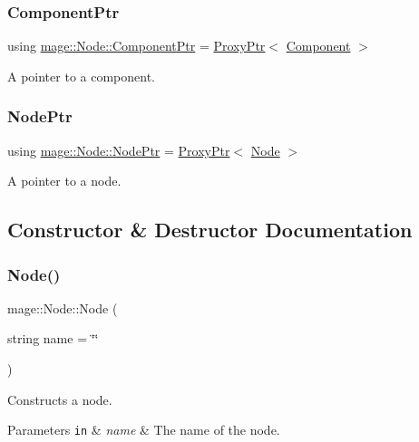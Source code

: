 \subsubsection{\texorpdfstring{Component\+Ptr}{ComponentPtr}}
{\footnotesize\ttfamily using \hyperlink{classmage_1_1_node_a46b7e1f4f5b98bfa78ed96a80797a4ba}{mage\+::\+Node\+::\+Component\+Ptr} =  \hyperlink{classmage_1_1_proxy_ptr}{Proxy\+Ptr}$<$ \hyperlink{classmage_1_1_component}{Component} $>$}

A pointer to a component. \hypertarget{classmage_1_1_node_ac575dc006e0ae1134277ade977dc06b6}{}\label{classmage_1_1_node_ac575dc006e0ae1134277ade977dc06b6} 
\subsubsection{\texorpdfstring{Node\+Ptr}{NodePtr}}
{\footnotesize\ttfamily using \hyperlink{classmage_1_1_node_ac575dc006e0ae1134277ade977dc06b6}{mage\+::\+Node\+::\+Node\+Ptr} =  \hyperlink{classmage_1_1_proxy_ptr}{Proxy\+Ptr}$<$ \hyperlink{classmage_1_1_node}{Node} $>$}

A pointer to a node. 

\subsection{Constructor \& Destructor Documentation}
\hypertarget{classmage_1_1_node_a6638b75608b2b340743a0a639230492d}{}\label{classmage_1_1_node_a6638b75608b2b340743a0a639230492d} 
\subsubsection{\texorpdfstring{Node()}{Node()}\hspace{0.1cm}{\footnotesize\ttfamily [1/3]}}
{\footnotesize\ttfamily mage\+::\+Node\+::\+Node (\begin{DoxyParamCaption}\item[{string}]{name = {\ttfamily \char`\"{}\char`\"{}} }\end{DoxyParamCaption})\hspace{0.3cm}{\ttfamily [explicit]}}

Constructs a node.


\begin{DoxyParams}[1]{Parameters}
\mbox{\tt in}  & {\em name} & The name of the node. \\
\hline
\end{DoxyParams}
\hypertarget{classmage_1_1_node_af9da591163469f210895f3a5b389d7cc}{}\label{classmage_1_1_node_af9da591163469f210895f3a5b389d7cc} 
